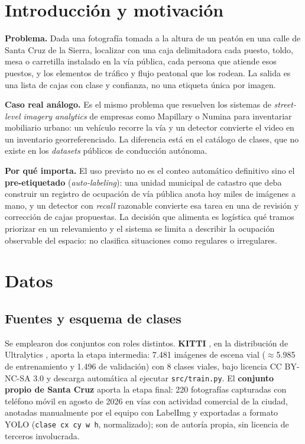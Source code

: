 \documentclass[10pt,a4paper]{article}
\begin{document}
\section{Introducción y motivación}
\textbf{Problema.} Dada una fotografía tomada a la altura de un peatón en una calle de
Santa Cruz de la Sierra, localizar con una caja delimitadora cada puesto, toldo, mesa o
carretilla instalado en la vía pública, cada persona que atiende esos puestos, y los
elementos de tráfico y flujo peatonal que los rodean. La salida es una lista de cajas con
clase y confianza, no una etiqueta única por imagen.

\textbf{Caso real análogo.} Es el mismo problema que resuelven los sistemas de
\emph{street-level imagery analytics} de empresas como Mapillary o Numina para
inventariar mobiliario urbano: un vehículo recorre la vía y un detector convierte el
video en un inventario georreferenciado. La diferencia está en el catálogo de clases, que
no existe en los \emph{datasets} públicos de conducción autónoma.

\textbf{Por qué importa.} El uso previsto no es el conteo automático definitivo sino el
\textbf{pre-etiquetado} (\emph{auto-labeling}): una unidad municipal de catastro que deba
construir un registro de ocupación de vía pública anota hoy miles de imágenes a mano, y un
detector con \emph{recall} razonable convierte esa tarea en una de revisión y corrección
de cajas propuestas. La decisión que alimenta es logística qué tramos priorizar en un
relevamiento y el sistema se limita a describir la ocupación observable del espacio: no
clasifica situaciones como regulares o irregulares.

\section{Datos}
\subsection{Fuentes y esquema de clases}
Se emplearon dos conjuntos con roles distintos. \textbf{KITTI} \cite{kitti}, en la
distribución de Ultralytics \cite{ultralytics}, aporta la etapa intermedia: 7{.}481
imágenes de escena vial ($\approx$5{.}985 de entrenamiento y 1{.}496 de validación) con 8
clases viales, bajo licencia CC BY-NC-SA 3.0 y descarga automática al ejecutar
\texttt{src/train.py}. El \textbf{conjunto propio de Santa Cruz} aporta la etapa final:
220 fotografías capturadas con teléfono móvil en agosto de 2026 en vías con actividad
comercial de la ciudad, anotadas manualmente por el equipo con LabelImg \cite{labelimg} y
exportadas a formato YOLO (\texttt{clase cx cy w h}, normalizado); son de autoría propia,
sin licencia de terceros involucrada.
\end{document}
